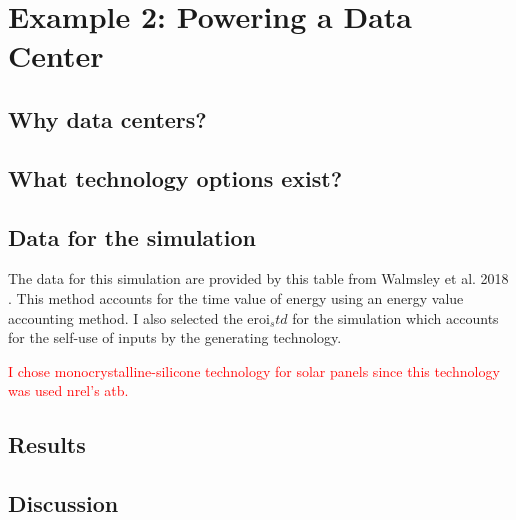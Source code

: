 \section{Example 2: Powering a Data Center}

\subsection{Why data centers?}

\subsection{What technology options exist?}

\subsection{Data for the simulation}

The data for this simulation are provided by this table from Walmsley et al. 2018 \cite{walmsley_energy_2018}. This method
accounts for the time value of energy using an energy value accounting method. I also selected the \acs{eroi}$_std$ for the simulation
which accounts for the self-use of inputs by the generating technology.

\textcolor{red}{I chose monocrystalline-silicone technology for solar panels since this technology was used \ac{nrel}'s \ac{atb}.}

\subsection{Results}

\subsection{Discussion}

